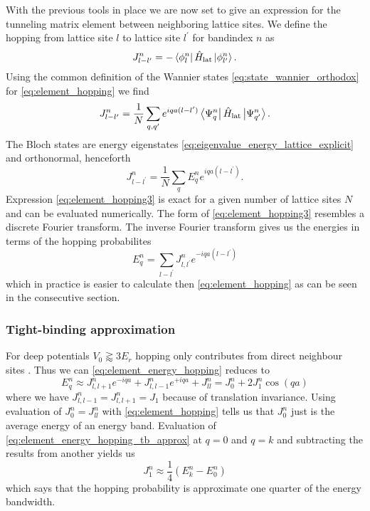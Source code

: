 With the previous tools in place we are now set to give an expression for the
tunneling matrix element between neighboring lattice sites. We define the
hopping from lattice site $l$ to lattice site $l^\prime$ for bandindex $n$ as
\begin{equation}
  J^n_{l-l^\prime}
  =-\bra{\phi^n_l}\hat{H}_\text{lat}\ket{\phi^n_{l^\prime}}.
  \label{eq:element_hopping}
\end{equation}
Using the common definition of the Wannier states
\cref{eq:state_wannier_orthodox} for \cref{eq:element_hopping} we find
\begin{equation}
  J^n_{l-l^\prime}
  =\frac{1}{N}\sum_{q,q^\prime}e^{iqa(l-l^\prime)}
  \bra{\Psi^n_q}\hat{H}_\text{lat}\ket{\Psi^n_{q^\prime}}
  \label{eq:element_hopping2}.
\end{equation}
The Bloch states are energy eigenstates
\cref{eq:eigenvalue_energy_lattice_explicit} and orthonormal, henceforth
\begin{equation}
  J^n_{l-l^\prime}
  =\frac{1}{N}\sum_{q}E^n_qe^{iqa(l-l^\prime)}
  \label{eq:element_hopping3}.
\end{equation}
Expression \cref{eq:element_hopping3} is exact for a given number of lattice
sites $N$ and can be evaluated numerically. The form of \cref{eq:element_hopping3}
resembles a discrete Fourier transform. The inverse Fourier transform gives us
the energies in terms of the hopping probabilites
\begin{equation}
  E^n_q
  =\sum_{l-l^\prime}J^n_{l,l^\prime}e^{-iqa(l-l^\prime)}
  \label{eq:element_energy_hopping}
\end{equation}
which in practice is easier to calculate then \cref{eq:element_hopping} as
can be seen in the consecutive section.

\subsubsection{Tight-binding approximation}

For deep potentials $V_0\gtrapprox3E_r$ hopping only contributes from direct
neighbour sites \cite{Rom2009}. Thus we can \cref{eq:element_energy_hopping}
reduces to
\begin{equation}
  E^n_q
  \approx J^n_{l,l+1}e^{-iqa}+J^n_{l,l-1}e^{+iqa}+J^n_{ll}
  =J^n_0+2J^n_1\cos(qa)
  \label{eq:element_energy_hopping_tb_approx}
\end{equation}
where we have $J^n_{l,l-1}=J^n_{l,l+1}=J_1$ because of translation invariance.
Using evaluation of $J^n_0=J^n_{ll}$ with \cref{eq:element_hopping} tells us
that $J^n_0$ just is the average energy of an energy band. Evaluation of
\cref{eq:element_energy_hopping_tb_approx} at $q=0$ and $q=k$ and subtracting
the results from another yields us
\begin{equation}
  J^n_1\approx\frac{1}{4}\left(E^n_k-E^n_0\right)
  \label{eq:hopping_amplitude_energies}
\end{equation}
which says that the hopping probability is approximate one quarter of the
energy bandwidth.


